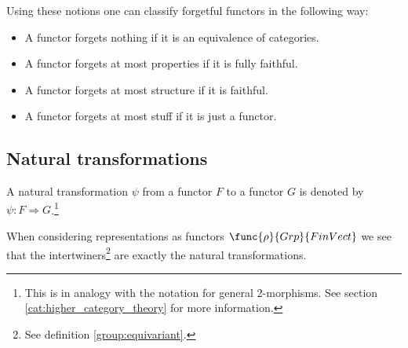 	Using these notions one can classify forgetful functors in the following way:
	\begin{itemize}
		\item A functor forgets nothing if it is an equivalence of categories.
		\item A functor forgets at most properties if it is fully faithful.
		\item A functor forgets at most structure if it is faithful.
		\item A functor forgets at most stuff if it is just a functor.
	\end{itemize}

\subsection{Natural transformations}

	\begin{notation}
		A natural transformation $\psi$ from a functor $F$ to a functor $G$ is denoted by $\psi: F\Rightarrow G$.\footnote{This is in analogy with the notation for general 2-morphisms. See section \ref{cat:higher_category_theory} for more information.}
	\end{notation}
	
	\begin{example}[Representation]
	        When considering representations as functors $\func{\rho}{Grp}{FinVect}$ we see that the intertwiners\footnote{See definition \ref{group:equivariant}.} are exactly the natural transformations.
	\end{example}
	
